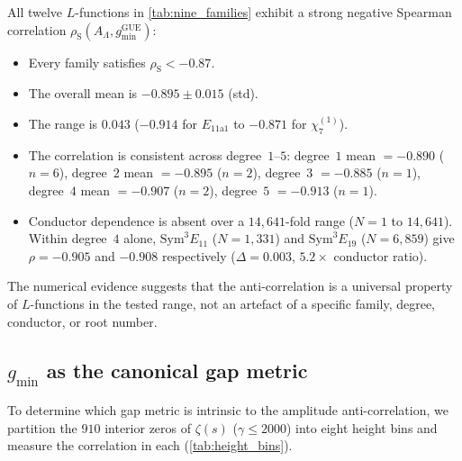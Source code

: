 \documentclass[11pt, a4paper]{article}
\theoremstyle{plain}
\theoremstyle{definition}
\newcommand{\Lam}{\Lambda}
\DeclareMathOperator{\GUE}{GUE}
\begin{document}
All twelve $L$-functions in \cref{tab:nine_families} exhibit a
strong negative Spearman correlation
$\rho_{\mathrm{S}}(A_\Lam, g_{\min}^{\GUE})$:
\begin{itemize}
  \item Every family satisfies $\rho_{\mathrm{S}} < -0.87$.
  \item The overall mean is $-0.895 \pm 0.015$ (std).
  \item The range is $0.043$
        ($-0.914$ for $E_{11\mathrm{a}1}$ to $-0.871$ for
        $\chi_7^{(1)}$).
  \item The correlation is consistent across degree~$1$--$5$:
        degree~$1$ mean $= -0.890$
        ($n = 6$), degree~$2$ mean $= -0.895$ ($n = 2$),
        degree~$3$ $= -0.885$ ($n = 1$),
        degree~$4$ mean $= -0.907$ ($n = 2$),
        degree~$5$ $= -0.913$ ($n = 1$).
  \item Conductor dependence is absent over a $14{,}641$-fold
        range ($N = 1$ to $14{,}641$).
        Within degree~$4$ alone, $\mathrm{Sym}^3 E_{11}$ ($N = 1{,}331$)
        and $\mathrm{Sym}^3 E_{19}$ ($N = 6{,}859$) give
        $\rho = -0.905$ and $-0.908$ respectively
        ($\Delta = 0.003$, $5.2\times$ conductor ratio).
\end{itemize}

The numerical evidence suggests that the anti-correlation is a
universal property of $L$-functions in the tested range, not an
artefact of a specific family, degree, conductor, or root number.


\subsection{$g_{\min}$ as the canonical gap metric}
\label{ssec:gap_min_canonical}

To determine which gap metric is intrinsic to the amplitude
anti-correlation, we partition the $910$ interior zeros of
$\zeta(s)$ ($\gamma \le 2000$) into eight height bins and
measure the correlation in each (\cref{tab:height_bins}).
\end{document}
